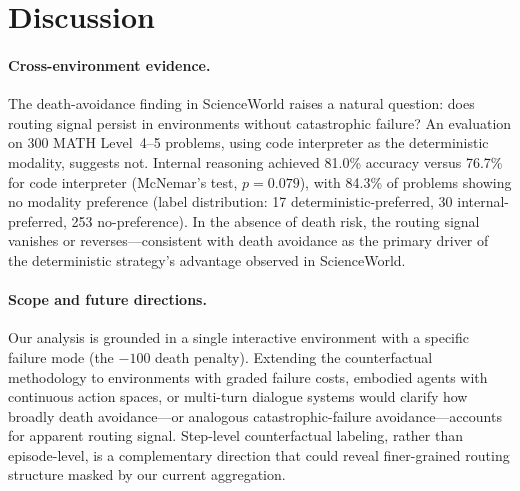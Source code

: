 \section{Discussion}
\label{sec:discussion}

\paragraph{Cross-environment evidence.}
The death-avoidance finding in ScienceWorld raises a natural question: does routing signal persist in environments without catastrophic failure? An evaluation on 300 MATH Level~4--5 problems, using code interpreter as the deterministic modality, suggests not. Internal reasoning achieved 81.0\% accuracy versus 76.7\% for code interpreter (McNemar's test, $p=0.079$), with 84.3\% of problems showing no modality preference (label distribution: 17 deterministic-preferred, 30 internal-preferred, 253 no-preference). In the absence of death risk, the routing signal vanishes or reverses---consistent with death avoidance as the primary driver of the deterministic strategy's advantage observed in ScienceWorld.

\paragraph{Scope and future directions.}
Our analysis is grounded in a single interactive environment with a specific failure mode (the $-100$ death penalty). Extending the counterfactual methodology to environments with graded failure costs, embodied agents with continuous action spaces, or multi-turn dialogue systems would clarify how broadly death avoidance---or analogous catastrophic-failure avoidance---accounts for apparent routing signal. Step-level counterfactual labeling, rather than episode-level, is a complementary direction that could reveal finer-grained routing structure masked by our current aggregation.
